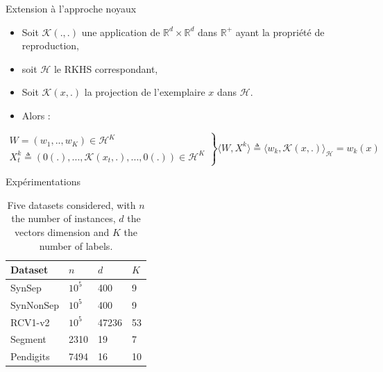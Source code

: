 \documentclass{beamer}
\begin{document}
\begin{frame}{Extension à l'approche noyaux}

	\begin{itemize}
		\item Soit $\mathcal{K}(.,.)$ une application de $ \mathbb{R}^d \times \mathbb{R}^d$ dans $ \mathbb{R}^+$ ayant la propriété de reproduction,
		\item soit $\mathcal{H}$ le RKHS correspondant,
	\item Soit $\mathcal{K}(x,.)$ la projection de l'exemplaire $x$ dans $\mathcal{H}$. 
	\item Alors : 
	\end{itemize}
	\begin{footnotesize}
	\begin{exampleblock}{}
		$
		\left.
		\begin{array}{l}
		W = (w_1,..,w_K) \in \mathcal{H}^K\\
		X_t^k \triangleq (0(.), ..., \mathcal{K}(x_t,.), ..., 0(.)) \in \mathcal{H}^{K}
		\end{array}
		\right\}
		\langle W,X^k\rangle \triangleq \langle w_k,\mathcal{K}(x,.)\rangle_\mathcal{H} = w_k(x)
		$
		
	\end{exampleblock}
	\end{footnotesize}	
\end{frame}

\begin{frame}{Expérimentations}
	\begin{table}[h]
		\caption{Five datasets considered, with $n$ the number of instances, $d$ the vectors dimension and $K$ the number of labels.}
		\label{table:mce}
		\begin{center}
			\begin{tabular}{l l l l}
				{\bf Dataset}  & {\bf $n$} & {\bf $d$} & {\bf $K$}\\
				\hline
				SynSep & $10^5$ 	& 400 	& 9 \\
				
				SynNonSep & $10^5$ & 400 	& 9 \\
				
				RCV1-v2  & $10^5$ 	& 47236 	& 53 \\
				
				Segment & 2310	& 19	& 7	\\
				
				Pendigits 	& 7494	& 16	& 10	\\
			\end{tabular}
		\end{center}
	\end{table}
\end{frame}
\end{document}
